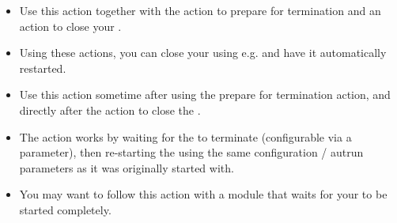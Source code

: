 
\begin{itemize}
\item Use this action together with the action to prepare for \gdaut{} termination and an action to close your \gdaut{}. 
\item Using these actions, you can close your \gdaut{} using e.g.  and have it automatically restarted.
\item Use this action sometime after using the prepare for termination action, and directly after the action to close the \gdaut{}. 
\item The action works by waiting for the \gdaut{} to terminate (configurable via a parameter), then re-starting the \gdaut{} using the same configuration / autrun parameters as it was originally started with.
\item You may want to follow this action with a module that waits for your \gdaut{} to be started completely.
\end{itemize}


